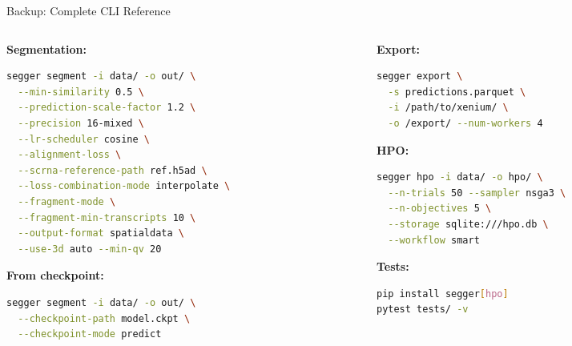 \documentclass[aspectratio=169,10pt]{beamer}
\begin{document}
\begin{frame}[fragile]{Backup: Complete CLI Reference}

{\scriptsize
\begin{columns}[T]
\begin{column}{0.48\textwidth}
\textbf{Segmentation:}
\begin{lstlisting}[language=bash]
segger segment -i data/ -o out/ \
  --min-similarity 0.5 \
  --prediction-scale-factor 1.2 \
  --precision 16-mixed \
  --lr-scheduler cosine \
  --alignment-loss \
  --scrna-reference-path ref.h5ad \
  --loss-combination-mode interpolate \
  --fragment-mode \
  --fragment-min-transcripts 10 \
  --output-format spatialdata \
  --use-3d auto --min-qv 20
\end{lstlisting}

\textbf{From checkpoint:}
\begin{lstlisting}[language=bash]
segger segment -i data/ -o out/ \
  --checkpoint-path model.ckpt \
  --checkpoint-mode predict
\end{lstlisting}
\end{column}

\begin{column}{0.48\textwidth}
\textbf{Export:}
\begin{lstlisting}[language=bash]
segger export \
  -s predictions.parquet \
  -i /path/to/xenium/ \
  -o /export/ --num-workers 4
\end{lstlisting}

\textbf{HPO:}
\begin{lstlisting}[language=bash]
segger hpo -i data/ -o hpo/ \
  --n-trials 50 --sampler nsga3 \
  --n-objectives 5 \
  --storage sqlite:///hpo.db \
  --workflow smart
\end{lstlisting}

\textbf{Tests:}
\begin{lstlisting}[language=bash]
pip install segger[hpo]
pytest tests/ -v
\end{lstlisting}
\end{column}
\end{columns}
}
\end{frame}
\end{document}

